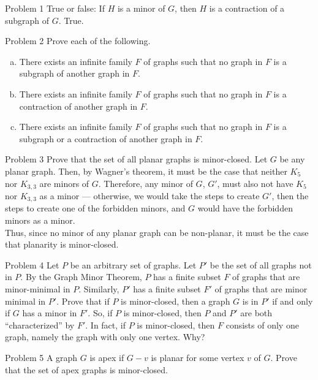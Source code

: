 \documentclass[8pt]{extarticle}
\title{}
\author{}
\date{}
\begin{document}
  \begin{problem}{Problem 1}
    True or false: If $H$ is a minor of $G$, then $H$ is a contraction of a subgraph of $G$.
    \tcblower
    True.
  \end{problem}
  \begin{problem}{Problem 2}
    Prove each of the following.
    \begin{enumerate}[(a)]
      \item There exists an infinite family $F$ of graphs such that no graph in $F$ is a subgraph of another graph in $F$.
      \item There exists an infinite family $F$ of graphs such that no graph in $F$ is a contraction of another graph in $F$.
      \item There exists an infinite family $F$ of graphs such that no graph in $F$ is a subgraph or a contraction of another graph in $F$.
    \end{enumerate}
  \end{problem}
  \begin{problem}{Problem 3}
    Prove that the set of all planar graphs is minor-closed.
    \tcblower
    Let $G$ be any planar graph. Then, by Wagner's theorem, it must be the case that neither $K_{5}$ nor $K_{3,3}$ are minors of $G$. Therefore, any minor of $G$, $G'$, must also not have $K_{5}$ nor $K_{3,3}$ as a minor --- otherwise, we would take the steps to create $G'$, then the steps to create one of the forbidden minors, and $G$ would have the forbidden minors as a minor.\\

    Thus, since no minor of any planar graph can be non-planar, it must be the case that planarity is minor-closed.
  \end{problem}
  \begin{problem}{Problem 4}
    Let $P$ be an arbitrary set of graphs. Let $P'$ be the set of all graphs not in $P$. By the Graph Minor Theorem, $P$ has a finite subset $F$ of graphs that are minor-minimal in $P$. Similarly, $P'$ has a finite subset $F'$ of graphs that are minor minimal in $P'$. Prove that if $P$ is minor-closed, then a graph $G$ is in $P'$ if and only if $G$ has a minor in $F'$. So, if $P$ is minor-closed, then $P$ and $P'$ are both ``characterized'' by $F'$. In fact, if $P$ is minor-closed, then $F$ consists of only one graph, namely the graph with only one vertex. Why?
  \end{problem}
  \begin{problem}{Problem 5}
    A graph $G$ is apex if $G-v$ is planar for some vertex $v$ of $G$. Prove that the set of apex graphs is minor-closed.
  \end{problem}
\end{document}
